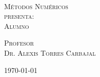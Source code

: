 \begin{titlepage}
\begin{minipage}[c][0.81\textheight][t]{0.75\textwidth}
\begin{center}
      {\color{black}{\large\scshape Portafolio de Evidencias}}\\[.2in]

      \vspace{1cm}            

      \textsc{\LARGE M\'etodos Num\'ericos}\\[2.5cm] %
      
      {\color{black}\textsc{\large presenta:}}\\[0.5cm]
      \textsc{\large {Alumno }}\\[1cm]          

      \vspace{0.5cm}

      {\large\scshape 
        {\color{black}Profesor}\\[0.3cm] {Dr. Alexis Torres Carbajal}}\\[.2in]

      \vspace{0.5cm}
       
      \large{\today}
    \end{center}
  \end{minipage}
\end{titlepage}
